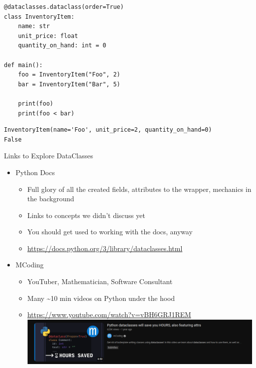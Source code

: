 
\begin{frame}[fragile]
%
\begin{codebox}
\begin{verbatim}
@dataclasses.dataclass(order=True)
class InventoryItem:
    name: str
    unit_price: float
    quantity_on_hand: int = 0

def main():
    foo = InventoryItem("Foo", 2)
    bar = InventoryItem("Bar", 5)

    print(foo)
    print(foo < bar)
\end{verbatim}
\end{codebox}
%
\begin{cmdbox}
\begin{verbatim}
InventoryItem(name='Foo', unit_price=2, quantity_on_hand=0)
False
\end{verbatim}
\end{cmdbox}
%
\end{frame}


\begin{frame}{Links to Explore DataClasses}
%
\begin{itemize}
\item Python Docs
	\begin{itemize}
	\item Full glory of all the created fields, attributes to the wrapper, mechanics in the background
	\item Links to concepts we didn't discuss yet
	\item You should get used to working with the docs, anyway
	\item \url{https://docs.python.org/3/library/dataclasses.html}
	\end{itemize}
\item MCoding
	\begin{itemize}
	\item YouTuber, Mathematician, Software Consultant
	\item Many \textasciitilde 10 min videos on Python under the hood
	\item \url{https://www.youtube.com/watch?v=vBH6GRJ1REM} \\
		\includegraphics[width=.8\linewidth]{./gfx/07-mcoding-dataclasses}
	\end{itemize}
\end{itemize}
%
\end{frame}

